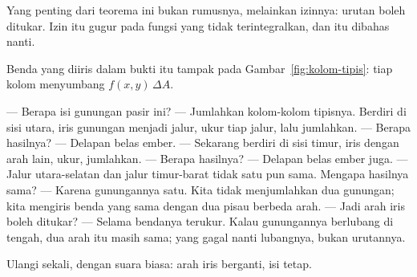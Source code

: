 Yang penting dari teorema ini bukan rumusnya, melainkan izinnya: urutan boleh
ditukar. Izin itu gugur pada fungsi yang tidak terintegralkan, dan itu dibahas
nanti.

Benda yang diiris dalam bukti itu tampak pada Gambar~\ref{fig:kolom-tipis}:
tiap kolom menyumbang $f(x,y)\,\Delta A$.

\begin{bacakeras}
--- Berapa isi gunungan pasir ini?
--- Jumlahkan kolom-kolom tipisnya. Berdiri di sisi utara, iris gunungan menjadi
jalur, ukur tiap jalur, lalu jumlahkan.
--- Berapa hasilnya?
--- Delapan belas ember.
--- Sekarang berdiri di sisi timur, iris dengan arah lain, ukur, jumlahkan.
--- Berapa hasilnya?
--- Delapan belas ember juga.
--- Jalur utara-selatan dan jalur timur-barat tidak satu pun sama. Mengapa
hasilnya sama?
--- Karena gunungannya satu. Kita tidak menjumlahkan dua gunungan; kita mengiris
benda yang sama dengan dua pisau berbeda arah.
--- Jadi arah iris boleh ditukar?
--- Selama bendanya terukur. Kalau gunungannya berlubang di tengah, dua arah itu
masih sama; yang gagal nanti lubangnya, bukan urutannya.

Ulangi sekali, dengan suara biasa: arah iris berganti, isi tetap.
\end{bacakeras}

